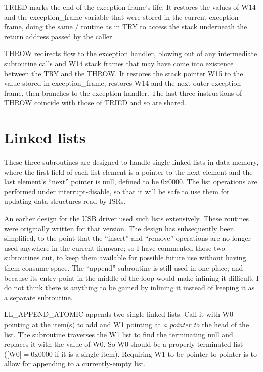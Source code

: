 TRIED marks the end of the exception frame's life.  It restores the values
of W14 and the exception\_frame variable that were stored in the current
exception frame, doing the same / routine as in TRY to
access the stack underneath the return address passed by the caller.

THROW redirects flow to the exception handler, blowing out of any
intermediate subroutine calls and W14 stack frames that may have come into
existence between the TRY and the THROW.  It restores the stack pointer W15
to the value stored in exception\_frame, restores W14 and the next outer
exception frame, then branches to the exception handler.  The last three
instructions of THROW coincide with those of TRIED and so are shared.

\section{Linked lists}

These three subroutines are designed to handle single-linked lists in data
memory, where the first field of each list element is a pointer to the next
element and the last element's ``next'' pointer is null, defined to be
0x0000.  The list operations are performed under 
interrupt-disable, so that it will be safe to use them for updating data
structures read by ISRs.

An earlier design for the USB driver used such lists extensively.  These
routines were originally written for that version.  The design has
subsequently been simplified, to the point that the ``insert'' and
``remove'' operations are no longer used anywhere in the current firmware;
so I have commented those two subroutines out, to keep them available for
possible future use without having them consume space.  The ``append''
subroutine is still used in one place; and because its entry point in the
middle of the loop would make inlining it difficult, I do not think there is
anything to be gained by inlining it instead of keeping it as a separate
subroutine.

LL\_APPEND\_ATOMIC appends two single-linked lists.  Call it with W0
pointing at the item(s) to add and W1 pointing at \emph{a pointer to} the
head of the list.  The subroutine traverses the W1 list to find the
terminating null and replaces it with the value of W0.  So W0 should be a
properly-terminated list ([W0]$=$0x0000 if it is a single item).  Requiring
W1 to be pointer to pointer is to allow for appending to a currently-empty
list.

